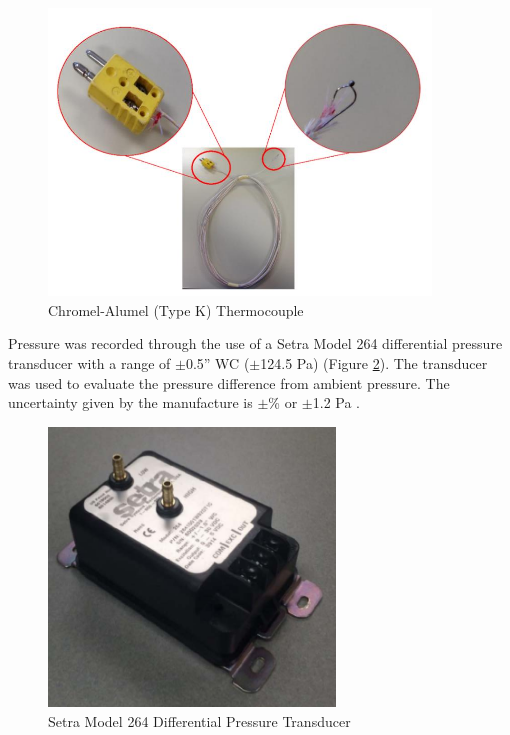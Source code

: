 \documentclass{article}
\begin{document}
\begin{figure} [H]
	\centering
	\includegraphics[width = 4in]{0_Images/Instrumentation/Thermocouple.jpg}
	\caption{Chromel-Alumel (Type K) Thermocouple}
	\label{fig:Thermocouple}
\end{figure}

Pressure was recorded through the use of a Setra Model 264 differential pressure transducer with a range of $\pm$0.5” WC ($\pm$124.5 Pa) (Figure \ref{fig:Setra}). The transducer was used to evaluate the pressure difference from ambient pressure. The uncertainty given by the manufacture is $\pm$\% or $\pm$1.2 Pa \cite{SetraManual}.

\begin{figure} [H]
	\centering
	\includegraphics[width = 3in]{0_Images/Instrumentation/Setra.jpg}
	\caption{Setra Model 264 Differential Pressure Transducer}
	\label{fig:Setra}
\end{figure}
\end{document}
